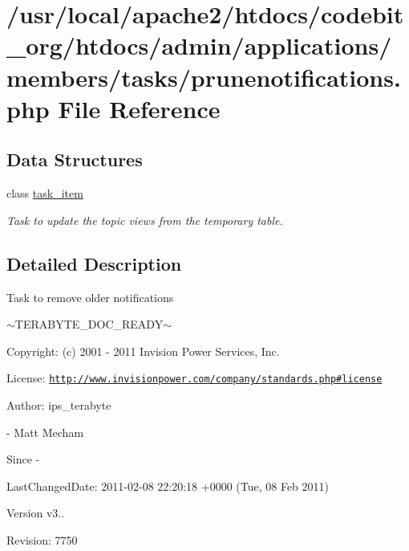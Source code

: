 \hypertarget{prunenotifications_8php}{\section{/usr/local/apache2/htdocs/codebit\-\_\-org/htdocs/admin/applications/members/tasks/prunenotifications.php File Reference}
\label{prunenotifications_8php}
}
\subsection*{Data Structures}
\begin{DoxyCompactItemize}
\item 
class \hyperlink{classtask__item}{task\-\_\-item}
\begin{DoxyCompactList}\small\item\em Task to update the topic views from the temporary table. \end{DoxyCompactList}\end{DoxyCompactItemize}


\subsection{Detailed Description}
\begin{DoxyVerb}  Task to remove older notifications
\end{DoxyVerb}
 $\sim$\-T\-E\-R\-A\-B\-Y\-T\-E\-\_\-\-D\-O\-C\-\_\-\-R\-E\-A\-D\-Y$\sim$ \begin{DoxyParagraph}{Copyright\-:}
(c) 2001 -\/ 2011 Invision Power Services, Inc.
\end{DoxyParagraph}
\begin{DoxyParagraph}{License\-:}
\href{http://www.invisionpower.com/company/standards.php#license}{\tt http\-://www.\-invisionpower.\-com/company/standards.\-php\#license}
\end{DoxyParagraph}
\begin{DoxyParagraph}{Author\-:}
ips\-\_\-terabyte 
\end{DoxyParagraph}
-\/ Matt Mecham \begin{DoxySince}{Since}
-\/ 
\end{DoxySince}
\begin{DoxyParagraph}{Last\-Changed\-Date\-:}
2011-\/02-\/08 22\-:20\-:18 +0000 (Tue, 08 Feb 2011) 
\end{DoxyParagraph}
\begin{DoxyVersion}{Version}
v3.. 
\end{DoxyVersion}
\begin{DoxyParagraph}{Revision\-:}
7750 
\end{DoxyParagraph}
